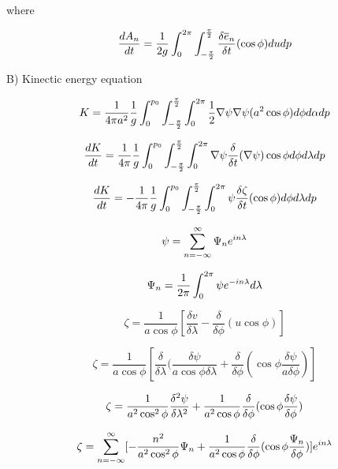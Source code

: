 \documentclass{article}
\begin{document}
where

\begin{equation}
\frac{dA_n}{dt} = \frac{1}{2g} \int_{0}^{2\pi} \int_{-\frac{\pi}{2}}^{\frac{\pi}{2}} \frac{\delta \overline{e}_n}{\delta t} (\cos{\phi}) du dp
\end{equation}

B) Kinectic energy equation

\begin{equation}
K = \frac{1}{4\pi a^2} \frac{1}{g} \int_{0}^{p_0} \int_{-\frac{\pi}{2}}^{\frac{\pi}{2}} \int_{0}^{2\pi} \frac{1}{2} \nabla \psi \nabla \psi (a^2 \cos{\phi}) d\phi d\alpha dp
\end{equation}

\begin{equation}
\frac{dK}{dt} = \frac{1}{4\pi} \frac{1}{g} \int_{0}^{p_0} \int_{-\frac{\pi}{2}}^{\frac{\pi}{2}} \int_{0}^{2\pi} \nabla \psi \frac{\delta}{\delta t} (\nabla \psi) \cos{\phi} d\phi d\lambda dp
\end{equation}

\begin{equation}
\frac{dK}{dt} = - \frac{1}{4\pi} \frac{1}{g} \int_{0}^{p_0} \int_{-\frac{\pi}{2}}^{\frac{\pi}{2}} \int_{0}^{2\pi} \psi \frac{\delta \zeta}{\delta t} (\cos{\phi}) d\phi d\lambda dp
\end{equation}

\begin{equation}
\psi = \sum_{n=-\infty}^{\infty} \Psi_n e^{in\lambda}
\end{equation}

\begin{equation}
\Psi_n = \frac{1}{2\pi} \int_{0}^{2\pi} \psi e^{-in\lambda} d\lambda
\end{equation}

\begin{equation}
\zeta = \frac{1}{a \cos{\phi}} [ \frac{\delta v}{\delta \lambda} - \frac{\delta}{\delta \phi} (u \cos{\phi}) ]
\end{equation}

\begin{equation}
\zeta = \frac{1}{a \cos{\phi}} [ \frac{\delta}{\delta \lambda} (\frac{\delta \psi}{a \cos{\phi} \delta \lambda} + \frac{\delta}{\delta \phi} ( \cos{\phi} \frac{\delta \psi}{a \delta \phi} ) ]
\end{equation}

\begin{equation}
\zeta = \frac{1}{a^2 \cos^2{\phi}} \frac{\delta^2 \psi}{\delta \lambda^2} + \frac{1}{a^2 \cos{\phi}} \frac{\delta}{\delta \phi} ( \cos{\phi} \frac{\delta \psi}{\delta \phi} )
\end{equation}

\begin{equation}
\zeta = \sum_{n=-\infty}^{\infty} [ - \frac{n^2}{a^2 \cos^2{\phi}} \Psi_n + \frac{1}{a^2 \cos{\phi}} \frac{\delta}{\delta \phi} (\cos{\phi} \frac{\Psi_n}{\delta \phi} ) ] e^{in\lambda}
\end{equation}
\end{document}

